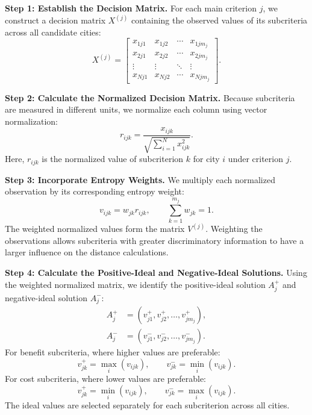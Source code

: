 \documentclass[11pt,letterpaper]{article}
\begin{document}
\par\vspace{0.14in}\noindent\textbf{Step 1: Establish the Decision Matrix.}
For each main criterion $j$, we construct a decision matrix $X^{(j)}$ containing the observed values of its subcriteria across all candidate cities:
\[
X^{(j)}=\begin{bmatrix}
x_{1j1}&x_{1j2}&\cdots&x_{1jm_j}\\
x_{2j1}&x_{2j2}&\cdots&x_{2jm_j}\\
\vdots&\vdots&\ddots&\vdots\\
x_{Nj1}&x_{Nj2}&\cdots&x_{Njm_j}
\end{bmatrix}.
\]
\par\vspace{0.14in}\noindent\textbf{Step 2: Calculate the Normalized Decision Matrix.}
Because subcriteria are measured in different units, we normalize each column using vector normalization:
\[
r_{ijk}=\frac{x_{ijk}}{\sqrt{\sum_{i=1}^{N}x_{ijk}^{2}}}.
\]
Here, $r_{ijk}$ is the normalized value of subcriterion $k$ for city $i$ under criterion $j$.

\par\vspace{0.14in}\noindent\textbf{Step 3: Incorporate Entropy Weights.}
We multiply each normalized observation by its corresponding entropy weight:
\[
v_{ijk}=w_{jk}r_{ijk},\qquad \sum_{k=1}^{m_j}w_{jk}=1.
\]
The weighted normalized values form the matrix $V^{(j)}$. Weighting the observations allows subcriteria with greater discriminatory information to have a larger influence on the distance calculations.

\par\vspace{0.14in}\noindent\textbf{Step 4: Calculate the Positive-Ideal and Negative-Ideal Solutions.}
Using the weighted normalized matrix, we identify the positive-ideal solution $A_j^+$ and negative-ideal solution $A_j^-$:
\[
\begin{aligned}
A_j^+&=(v_{j1}^+,v_{j2}^+,\ldots,v_{jm_j}^+),\\
A_j^-&=(v_{j1}^-,v_{j2}^-,\ldots,v_{jm_j}^-).
\end{aligned}
\]
For benefit subcriteria, where higher values are preferable:
\[
v_{jk}^+=\max_i(v_{ijk}),\qquad v_{jk}^-=\min_i(v_{ijk}).
\]
For cost subcriteria, where lower values are preferable:
\[
v_{jk}^+=\min_i(v_{ijk}),\qquad v_{jk}^-=\max_i(v_{ijk}).
\]
The ideal values are selected separately for each subcriterion across all cities.
\end{document}
